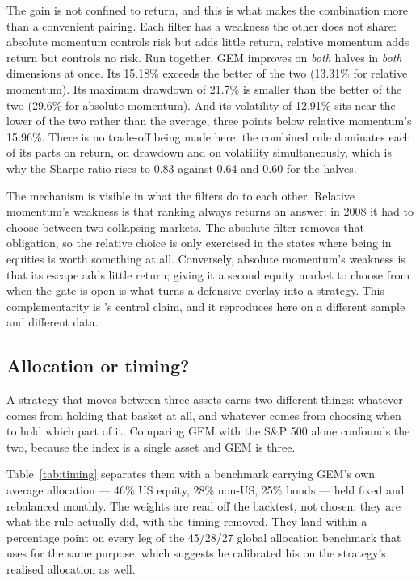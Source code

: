 \documentclass[11pt,a4paper]{article}
\let\oldsubsection\subsection
\renewcommand{\subsection}{\FloatBarrier\oldsubsection}
\begin{document}
The gain is not confined to return, and this is what makes the combination more
than a convenient pairing. Each filter has a weakness the other does not share:
absolute momentum controls risk but adds little return, relative momentum adds
return but controls no risk. Run together, GEM improves on \emph{both} halves in
\emph{both} dimensions at once. Its 15.18\% exceeds the better of the two
(13.31\% for relative momentum). Its maximum drawdown of 21.7\% is smaller than
the better of the two (29.6\% for absolute momentum). And its volatility of
12.91\% sits near the lower of the two rather than the average, three points
below relative momentum's 15.96\%. There is no trade-off being made here: the
combined rule dominates each of its parts on return, on drawdown and on
volatility simultaneously, which is why the Sharpe ratio rises to 0.83 against
0.64 and 0.60 for the halves.

The mechanism is visible in what the filters do to each other. Relative
momentum's weakness is that ranking always returns an answer: in 2008 it had to
choose between two collapsing markets. The absolute filter removes that
obligation, so the relative choice is only exercised in the states where being
in equities is worth something at all. Conversely, absolute momentum's weakness
is that its escape adds little return; giving it a second equity market to
choose from when the gate is open is what turns a defensive overlay into a
strategy. This complementarity is \citeauthor{antonacci2016}'s central claim,
and it reproduces here on a different sample and different data.

\subsection{Allocation or timing?}

A strategy that moves between three assets earns two different things: whatever
comes from holding that basket at all, and whatever comes from choosing when to
hold which part of it. Comparing GEM with the S\&P 500 alone confounds the two,
because the index is a single asset and GEM is three.

Table~\ref{tab:timing} separates them with a benchmark carrying GEM's own
average allocation --- 46\% US equity, 28\% non-US, 25\% bonds --- held fixed
and rebalanced monthly. The weights are read off the backtest, not chosen: they
are what the rule actually did, with the timing removed. They land within a
percentage point on every leg of the 45/28/27 global allocation benchmark that
\citet{antonacci2018} uses for the same purpose, which suggests he calibrated
his on the strategy's realised allocation as well.
\end{document}
